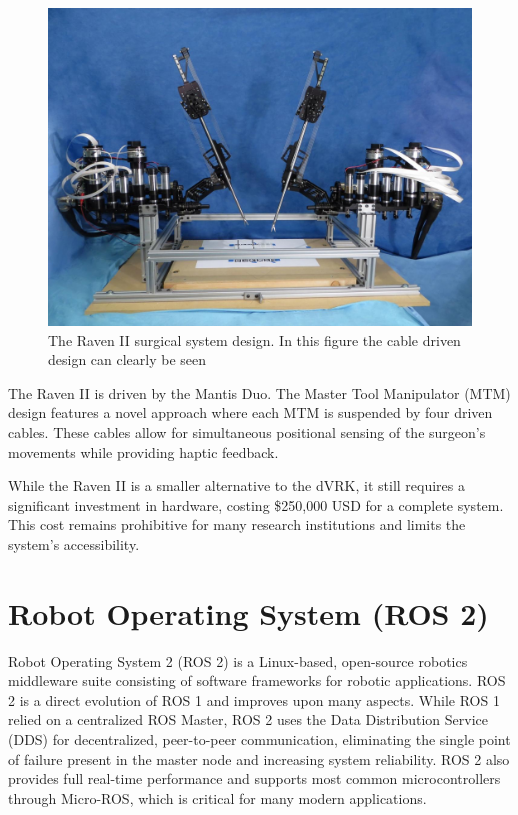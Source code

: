 \begin{figure}[h!]
    \centering
    \includegraphics[width=1.0\linewidth]{figures/raven_II.jpg}
    \caption{The Raven II surgical system design. In this figure the cable driven design can clearly be seen \cite{Hannaford2013RavenII}}
    \label{fig:ravenII_design}
\end{figure}

The Raven II is driven by the Mantis Duo. The Master Tool Manipulator (MTM) design features a novel approach where each MTM is suspended by four driven cables. These cables allow for simultaneous positional sensing of the surgeon's movements while providing haptic feedback.

While the Raven II is a smaller alternative to the dVRK, it still requires a significant investment in hardware, costing \$250,000 USD \cite{RobotsGuideRaven} for a complete system. This cost remains prohibitive for many research institutions and limits the system's accessibility.
\section{Robot Operating System (ROS 2)}

Robot Operating System 2 (ROS 2) is a Linux-based, open-source robotics middleware suite consisting of software frameworks for robotic applications. ROS 2 is a direct evolution of ROS 1 and improves upon many aspects. While ROS 1 relied on a centralized ROS Master, ROS 2 uses the Data Distribution Service (DDS) for decentralized, peer-to-peer communication, eliminating the single point of failure present in the master node and increasing system reliability. ROS 2 also provides full real-time performance and supports most common microcontrollers through Micro-ROS, which is critical for many modern applications.

